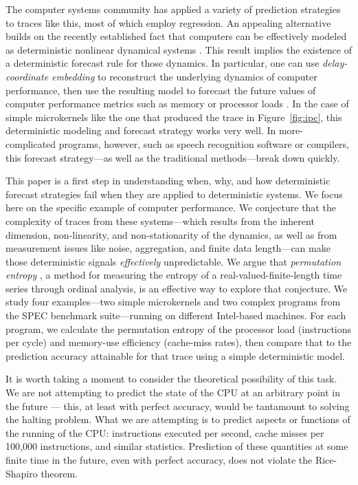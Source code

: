 The computer systems community has applied a variety of prediction
strategies to traces like this, most of which employ regression.  An
appealing alternative builds on the recently established fact that
computers can be effectively modeled as deterministic nonlinear
dynamical systems \cite{mytkowicz09}.  This result implies the
existence of a deterministic forecast rule for those dynamics.  In
particular, one can use \emph{delay-coordinate embedding} to
reconstruct the underlying dynamics of computer performance, then use
the resulting model to forecast the future values of computer
performance metrics such as memory or processor loads
\cite{josh-ida2011}.  In the case of simple microkernels like the one
that produced the trace in Figure~\ref{fig:ipc}, this deterministic
modeling and forecast strategy works very well.  In more-complicated
programs, however, such as speech recognition software or compilers,
this forecast strategy---as well as the traditional methods---break
down quickly.

This paper is a first step in understanding when, why, and how
deterministic forecast strategies fail when they are applied to
deterministic systems.  We focus here on the specific example of
computer performance.  We conjecture that the complexity of traces
from these systems---which results from the inherent dimension,
non-linearity, and non-stationarity of the dynamics, as well as from
measurement issues like noise, aggregation, and finite data
length---can make those deterministic signals \emph{effectively}
unpredictable.  We argue that \emph{permutation entropy}
\cite{bandt2002per}, a method for measuring the entropy of a
real-valued-finite-length time series through ordinal analysis, is an
effective way to explore that conjecture.  We study four
examples---two simple microkernels and two complex programs from the
SPEC benchmark suite---running on different Intel-based machines.  For
each program, we calculate the permutation entropy of the processor
load (instructions per cycle) and memory-use efficiency (cache-miss
rates), then compare that to the prediction accuracy attainable for
that trace using a simple deterministic model.

It is worth taking a moment to consider the theoretical possibility of
this task. We are not attempting to predict the state of the CPU at an
arbitrary point in the future --- this, at least with perfect
accuracy, would be tantamount to solving the halting problem. What we
are attempting is to predict aspects or functions of the running of
the CPU: instructions executed per second, cache misses per 100,000
instructions, and similar statistics. Prediction of these quantities
at some finite time in the future, even with perfect accuracy, does
not violate the Rice-Shapiro theorem.

